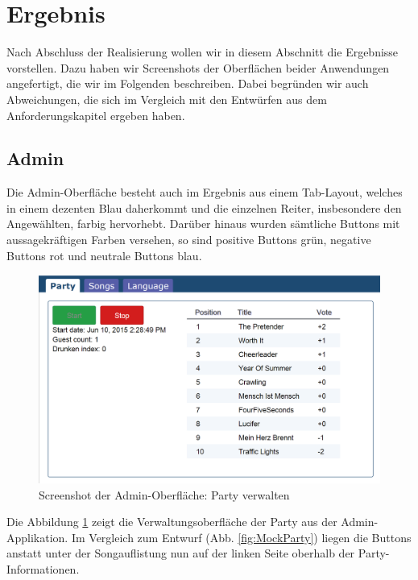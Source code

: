 \section{Ergebnis}
Nach Abschluss der Realisierung wollen wir in diesem Abschnitt die Ergebnisse vorstellen. Dazu haben wir Screenshots der Oberflächen beider Anwendungen angefertigt, die wir im Folgenden beschreiben. Dabei begründen wir auch Abweichungen, die sich im Vergleich mit den Entwürfen aus dem Anforderungskapitel ergeben haben.

\subsection{Admin}
Die Admin-Oberfläche besteht auch im Ergebnis aus einem Tab-Layout, welches in einem dezenten Blau daherkommt und die einzelnen Reiter, insbesondere den Angewählten, farbig hervorhebt. Darüber hinaus wurden sämtliche Buttons mit aussagekräftigen Farben versehen, so sind positive Buttons grün, negative Buttons rot und neutrale Buttons blau.

\begin{figure}[H]
\centering
\includegraphics[width=0.9\linewidth]{Bilder/Screenshot-Admin-Party}
\caption{Screenshot der Admin-Oberfläche: Party verwalten}
\label{fig:Screenshot-Admin-Party}
\end{figure}

Die Abbildung \ref{fig:Screenshot-Admin-Party} zeigt die Verwaltungsoberfläche der Party aus der Admin-Applikation. Im Vergleich zum Entwurf (Abb. \ref{fig:MockParty}) liegen die Buttons anstatt unter der Songauflistung nun auf der linken Seite oberhalb der Party-Informationen.

